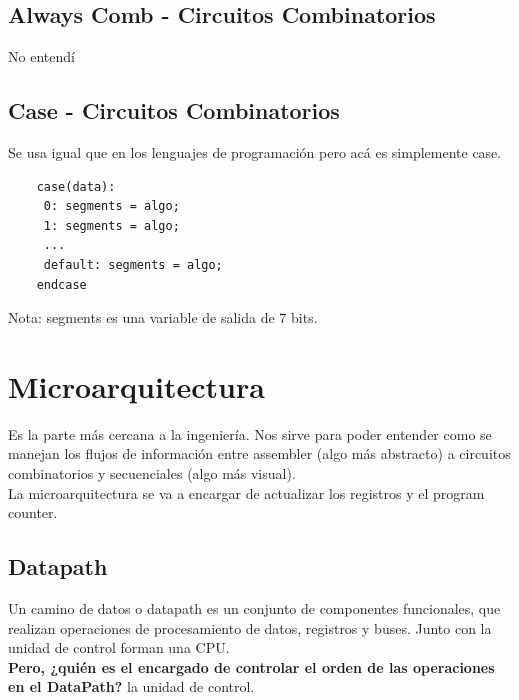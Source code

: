 \documentclass[10pt,a4paper]{article}
\begin{document}
\subsection*{Always Comb - Circuitos Combinatorios}
No entendí
\subsection*{Case - Circuitos Combinatorios}
Se usa igual que en los lenguajes de programación pero acá es simplemente case.
\begin{lstlisting}
    case(data):
     0: segments = algo;
     1: segments = algo; 
     ...
     default: segments = algo; 
    endcase
\end{lstlisting}
Nota: segments es una variable de salida de 7 bits.
\section*{Microarquitectura}
Es la parte más cercana a la ingeniería. Nos sirve para poder entender como se manejan los flujos de información entre assembler (algo más abstracto) a circuitos combinatorios y secuenciales (algo más visual). \\
La microarquitectura se va a encargar de actualizar los registros y el program counter. \\

\subsection*{Datapath}
Un camino de datos o datapath es un conjunto de componentes funcionales, que realizan operaciones de procesamiento de datos, registros y buses. Junto con la unidad de control forman una CPU. \\
\textbf{Pero, ¿quién es el encargado de controlar el orden de las operaciones en el DataPath?} la unidad de control. \\  
\end{document}
